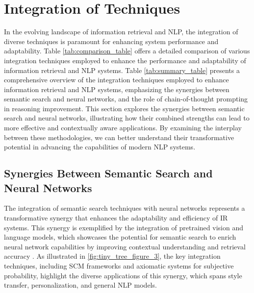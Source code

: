 \section{Integration of Techniques} \label{sec:Integration of Techniques}



In the evolving landscape of information retrieval and NLP, the integration of diverse techniques is paramount for enhancing system performance and adaptability. Table \ref{tab:comparison_table} offers a detailed comparison of various integration techniques employed to enhance the performance and adaptability of information retrieval and NLP systems. Table \ref{tab:summary_table} presents a comprehensive overview of the integration techniques employed to enhance information retrieval and NLP systems, emphasizing the synergies between semantic search and neural networks, and the role of chain-of-thought prompting in reasoning improvement. This section explores the synergies between semantic search and neural networks, illustrating how their combined strengths can lead to more effective and contextually aware applications. By examining the interplay between these methodologies, we can better understand their transformative potential in advancing the capabilities of modern NLP systems.








\subsection{Synergies Between Semantic Search and Neural Networks} \label{subsec:Synergies Between Semantic Search and Neural Networks}

The integration of semantic search techniques with neural networks represents a transformative synergy that enhances the adaptability and efficiency of IR systems. This synergy is exemplified by the integration of pretrained vision and language models, which showcases the potential for semantic search to enrich neural network capabilities by improving contextual understanding and retrieval accuracy \cite{kaur2024cropcontextwiserobuststatic}. As illustrated in \autoref{fig:tiny_tree_figure_3}, the key integration techniques, including SCM frameworks and axiomatic systems for subjective probability, highlight the diverse applications of this synergy, which spans style transfer, personalization, and general NLP models.

